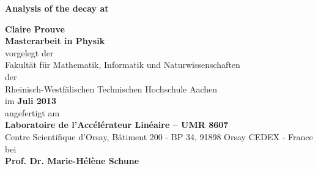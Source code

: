 \titlehead{%
} %
\titlefoot{%
}

\newsavebox{\Prof}

\begin{titlepage}
\begin{center}
\hbox{} %
\vspace*{2.5cm}
{\Huge\bfseries Analysis of the \BdKstee decay at \lhcb \par}
\vskip 1.5cm
\large{ \textbf{Claire Prouve}}\normalsize\\
\vspace{2.cm}
\large{\textbf{Masterarbeit in Physik}}\normalsize\\
\vspace*{1.5cm}
vorgelegt der\\
Fakult\"{a}t f\"{u}r Mathematik, Informatik und Naturwissenschaften\\
der\\
Rheinisch-Westf\"{a}lischen Technischen Hochschule Aachen\\

 im \textbf{Juli 2013}\\%
\vspace*{1cm}
angefertigt am\\
\textbf{Laboratoire de l'Acc\'{e}l\'{e}rateur Lin\'{e}aire -- UMR 8607}\\
{\small Centre Scientifique d'Orsay, B\^{a}timent 200 - BP 34, 91898 Orsay CEDEX - France}\normalsize\\
\vspace*{0.5cm}
bei\\
\textbf{Prof. Dr. Marie-H\'{e}l\`{e}ne Schune}\\
\vspace*{0.5cm}
\end{center}
\end{titlepage}
